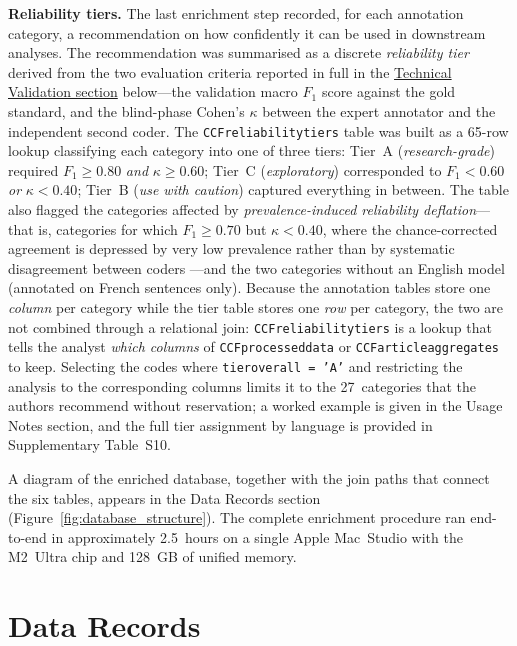 \documentclass[12pt]{article}
\renewcommand\_{\texttt{\detokenize{_}\allowbreak}}
\begin{document}
{\bfseries{Reliability tiers.}} The last enrichment step recorded, for each annotation category, a recommendation on how confidently it can be used in downstream analyses. The recommendation was summarised as a discrete \emph{reliability tier} derived from the two evaluation criteria reported in full in the \hyperref[sec:technical_validation]{Technical Validation section} below---the validation macro $F_1$ score against the gold standard, and the blind-phase Cohen's $\kappa$ between the expert annotator and the independent second coder. The \texttt{CCF\_reliability\_tiers} table was built as a 65-row lookup classifying each category into one of three tiers: Tier~A (\emph{research-grade}) required $F_1 \geq 0.80$ \emph{and} $\kappa \geq 0.60$; Tier~C (\emph{exploratory}) corresponded to $F_1 < 0.60$ \emph{or} $\kappa < 0.40$; Tier~B (\emph{use with caution}) captured everything in between. The table also flagged the categories affected by \emph{prevalence-induced reliability deflation}---that is, categories for which $F_1 \geq 0.70$ but $\kappa < 0.40$, where the chance-corrected agreement is depressed by very low prevalence rather than by systematic disagreement between coders \autocite{feinstein_high_1990, byrt_bias_1993}---and the two categories without an English model (annotated on French sentences only). Because the annotation tables store one \emph{column} per category while the tier table stores one \emph{row} per category, the two are not combined through a relational join: \texttt{CCF\_reliability\_tiers} is a lookup that tells the analyst \emph{which columns} of \texttt{CCF\_processed\_data} or \texttt{CCF\_article\_aggregates} to keep. Selecting the codes where \texttt{tier\_overall = 'A'} and restricting the analysis to the corresponding columns limits it to the 27~categories that the authors recommend without reservation; a worked example is given in the Usage Notes section, and the full tier assignment by language is provided in Supplementary Table~S10.

A diagram of the enriched database, together with the join paths that connect the six tables, appears in the Data Records section (Figure~\ref{fig:database_structure}). The complete enrichment procedure ran end-to-end in approximately 2.5~hours on a single Apple Mac~Studio with the M2~Ultra chip and 128~GB of unified memory.



\section{Data Records}
\label{sec:data_records}
\end{document}
